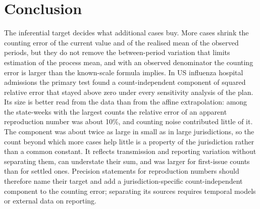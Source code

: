 \section{Conclusion}
\label{sec:conclusion}

The inferential target decides what additional cases buy. More cases shrink the counting error of the current value and of the realised mean of the observed periods, but they do not remove the between-period variation that limits estimation of the process mean, and with an observed denominator the counting error is larger than the known-scale formula implies. In US influenza hospital admissions the primary test found a count-independent component of squared relative error that stayed above zero under every sensitivity analysis of the plan. Its size is better read from the data than from the affine extrapolation: among the state-weeks with the largest counts the relative error of an apparent reproduction number was about 10\%, and counting noise contributed little of it. The component was about twice as large in small as in large jurisdictions, so the count beyond which more cases help little is a property of the jurisdiction rather than a common constant. It reflects transmission and reporting variation without separating them, can understate their sum, and was larger for first-issue counts than for settled ones. Precision statements for reproduction numbers should therefore name their target and add a jurisdiction-specific count-independent component to the counting error; separating its sources requires temporal models or external data on reporting.
